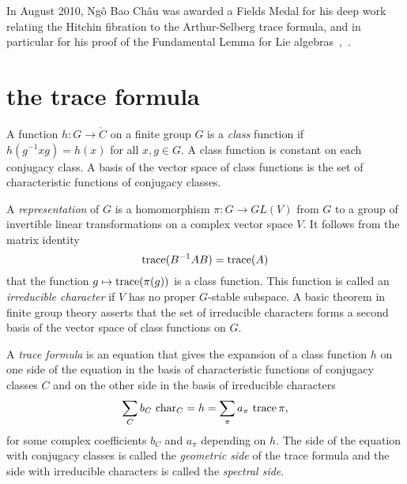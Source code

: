 \def\tikzfig#1#2#3{%
\begin{figure}[htb]%
  \centering
\begin{tikzpicture}#3
\end{tikzpicture}
  \caption{#2}
  \label{fig:#1}%
\end{figure}%
}


\def\gg{\mathfrak{g}}
\def\cc{\mathfrak{c}}
\def\AA{{\mathcal A}}
\def\MM{{\mathcal M}}
\def\OO{{\mathcal O}}
\def\UU{{\mathcal U}}
\def\XX{$\langle\text{\it insert}\rangle$}

In August 2010, Ng\^o Bao Ch\^au was awarded a Fields Medal for his
deep work relating the Hitchin fibration to the Arthur-Selberg trace
formula, and in particular for his proof of the Fundamental Lemma for
Lie algebras~\cite{NBC:2006},~\cite{NBC:2010}.


\section{the trace formula}

A function $h:G\to\ring{C}$ on a finite group $G$ is a {\it class} function
if $h(g^{-1} x g) = h(x)$ for all $x,g\in G$.  A class
function is constant on each conjugacy class.  A basis of the
vector space of class functions is the set of characteristic functions
of conjugacy classes.

A {\it representation} of $G$ is a homomorphism $\pi:G\to GL(V)$ from $G$
to a group of invertible linear transformations on a complex vector
space $V$.  It follows from the matrix identity 
\[
{\operatorname{trace}}( B^{-1} A B) = {\operatorname{trace}} (A)
\]
that the function $g\mapsto {\operatorname{trace}}(\pi(g))$
is a class function.  This function is called an
{\it irreducible character} if $V$ has no proper $G$-stable subspace.
A basic theorem in finite group theory asserts that the set of
irreducible characters forms a second basis of the vector space of
class functions on $G$. 

A {\it trace formula} is an equation that gives the expansion of a
class function $h$ on one side of the equation in the basis of
characteristic functions of conjugacy classes $C$ and on the other
side in the basis of irreducible characters
\[
\sum_C b_C\ {\operatorname{char}}_C     =  h = \sum_\pi a_\pi\ {\operatorname{trace}}\, \pi,
\]
for some complex coefficients $b_C$ and $a_\pi$ depending on $h$.
The side of the equation with conjugacy classes is called the {\it
  geometric side} of the trace formula and the side with irreducible
characters is called the {\it spectral side}.

